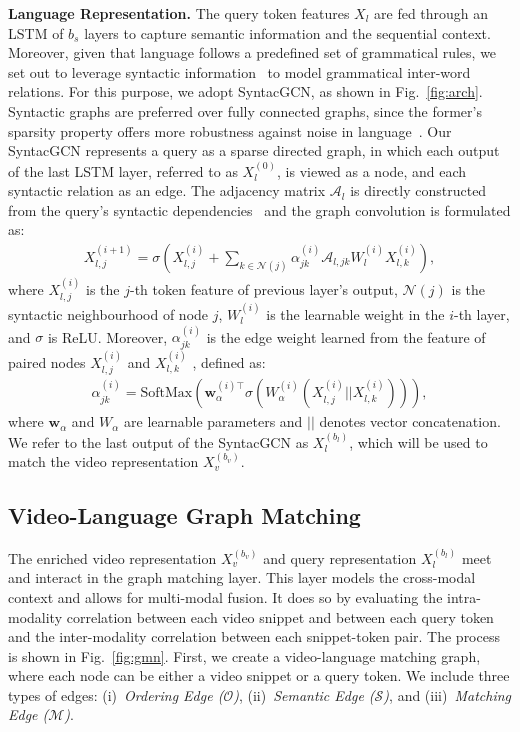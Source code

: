\documentclass[10pt,twocolumn,letterpaper]{article}
\begin{document}
\noindent\textbf{Language Representation.} The query token features $X_l$ are fed through an LSTM of $b_s$ layers to capture semantic information and the sequential
context. Moreover, given that language follows a predefined set of grammatical rules, we set out to leverage syntactic information~\cite{marcheggiani_titov_2017_encoding, zhang_etal_2018_graph} to model grammatical inter-word relations. For this purpose, we adopt SyntacGCN, as shown in Fig.~\ref{fig:arch}. Syntactic graphs are preferred over fully connected graphs, since the former's sparsity property offers more robustness against noise in language~\cite{huang2020aligned}. Our SyntacGCN represents a query as a sparse directed graph, in which each output of the last LSTM layer, referred to as $X_l^{(0)}$, is viewed as a node, and each syntactic relation as an edge. The adjacency matrix $\mathcal{A}_l$ is directly constructed from the query's syntactic dependencies~\cite{manning2014stanford} and the graph convolution is formulated as: \begin{align} \label{eq:syntacGCN}
 X_{l,j}^{(i+1)} = \sigma \left(X_{l,j}^{(i)} + \sum_{k\in \mathcal{N}(j)} {\alpha_{jk}^{(i)} \mathcal{A}_{l,jk} W_l^{(i)} X_{l,k}^{(i)} }\right),
\end{align}
where $X_{l,j}^{(i)}$ is the $j$-th token feature of previous layer's output, $\mathcal{N}(j)$ is the syntactic neighbourhood of node $j$, $W_l^{(i)}$ is the learnable weight in the $i$-th layer, and $\sigma$ is ReLU. Moreover, $\alpha_{jk}^{(i)}$ is the edge weight learned from the feature of paired nodes $X_{l,j}^{(i)}$ and $X_{l,k}^{(i)}$ , defined as: 
\begin{align} \label{eq:alpha_relation}
  \alpha_{jk}^{(i)}= \mathrm{SoftMax}( \mathbf{w}_\alpha^{(i)\top} \sigma(W_\alpha^{(i)}(X_{l,j}^{(i)}||X_{l,k}^{(i)}))),
\end{align}
where $\mathbf{w}_\alpha$ and $W_\alpha$ are learnable parameters and $||$ denotes vector concatenation. We refer to the last output of the SyntacGCN as $X_l^{(b_l)}$, which will be used to match the video representation $X_v^{(b_v)}$.




\subsection{Video-Language Graph Matching}\label{subsec: Match}
The enriched video representation $X_v^{(b_v)}$ and query representation $X_l^{(b_l)}$ meet and interact in the graph matching layer. This layer models the cross-modal context and allows for multi-modal fusion. 
It does so by evaluating the intra-modality correlation between each video snippet and between each query token and the inter-modality correlation between each snippet-token pair. 
The process is shown in Fig.~\ref{fig:gmn}. 
First, we create a video-language matching graph, where each node can be either a video snippet or a query token. We include three types of edges: (i)~\textit{Ordering Edge ($\mathcal{O}$)}, (ii)~\textit{Semantic Edge ($\mathcal{S}$)}, and (iii)~\textit{Matching Edge ($\mathcal{M}$)}. 
\end{document}

